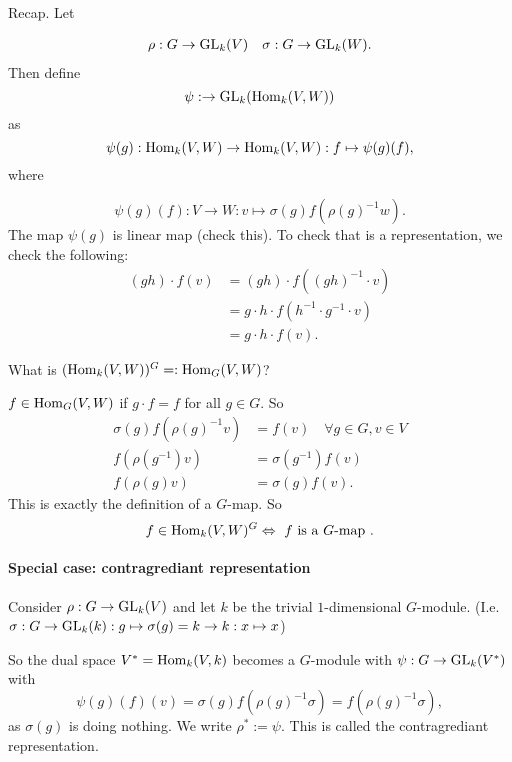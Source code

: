 

Recap.
Let 

\begin{align*}
    \rho: G \to \operatorname{GL}_{k}(V) && \sigma: G \to \operatorname{GL}_{k}(W)
.\end{align*}
Then define
\[
\psi: \to \operatorname{GL}_{k}(\operatorname{Hom}_{k}(V, W))
\] 
as
\[
    \psi(g) : \operatorname{Hom}_{k}(V, W) \to  \operatorname{Hom}_{k}(V, W) : f \mapsto \psi(g) (f)
,\] 
where

\[
    \psi(g)(f) : V \to  W : v \mapsto  \sigma(g) f(\rho(g)^{-1} w)
.\] 
The map $\psi(g)$ is linear map (check this).
To check that is a representation, we check the following:
\begin{align*}
    (gh) \cdot  f (v) &= (gh) \cdot  f((gh)^{-1} \cdot v)\\
                      &= g \cdot  h \cdot  f ( h^{-1} \cdot  g ^{-1} \cdot  v )\\
                      &= g \cdot  h \cdot  f(v)
.\end{align*}

\begin{remark}
    What is $(\operatorname{Hom}_{k}(V, W))^{G} =: \operatorname{Hom}_{G}(V, W)$?

    $f \in \operatorname{Hom}_{G}(V, W)$ if $g \cdot  f = f$ for all $g \in G$.
    So
    \begin{align*}
        \sigma(g) f(\rho(g)^{-1} v) &= f(v) \quad \forall  g \in  G, v \in V\\
        f(\rho(g^{-1}) v) &= \sigma(g^{-1} ) f(v)\\
        f(\rho(g) v) &= \sigma(g) f(v)
    .\end{align*}
    This is exactly the definition of a $G$-map.
    So 
    \[
    f \in \operatorname{Hom}_{k}(V, W)^{G} \Leftrightarrow \text{ $f $ is a $G$-map }
    .\] 

\end{remark}

\paragraph{Special case: contragrediant representation}
    
    Consider $\rho: G \to \operatorname{GL}_{k}(V)$ and let $k$ be the trivial $1$-dimensional $G$-module.
    (I.e. $\sigma: G \to \operatorname{GL}_{k}(k): g \mapsto  \sigma(g) = k \to  k : x \mapsto x$)

    So the dual space $V^{*} = \operatorname{Hom}_{k}(V, k)$ becomes a $G$-module with $\psi: G \to \operatorname{GL}_{k}(V^{*})$ with
    \[
        \psi(g)(f)(v) = \sigma(g) f(\rho(g)^{-1} \sigma) = f(\rho(g)^{-1} \sigma)
    ,\] 
    as $\sigma(g)$ is doing nothing.
    We write $\rho^{*} := \psi$.
    This is called the contragrediant representation.


